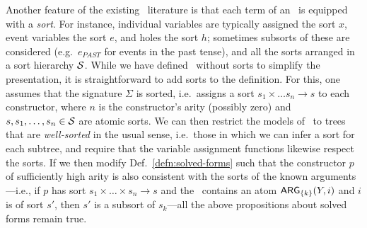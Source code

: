 Another feature of the existing \rmrs\ literature is that each term of
an \rmrs\ is equipped 
with a \emph{sort}.  For instance, individual variables are typically
assigned the sort $x$, event variables the sort $e$, and holes the
sort $h$; sometimes subsorts of these are considered (e.g.\ $e_{PAST}$
for events in the past tense), and all the sorts arranged in a sort
hierarchy ${\cal S}$.
While we have defined \rmrs\ without sorts to simplify the
presentation, it is straightforward to add sorts to the definition.
For this, one assumes that the signature $\Sigma$ is sorted, i.e.\
assigns a sort $s_1\times\ldots s_n\rightarrow s$ to each constructor,
where $n$ is the constructor's arity (possibly zero) and
$s,s_1,\ldots,s_n\in {\cal S}$ are atomic sorts.  We can then
restrict the models of \rmrs\ to trees that are \emph{well-sorted} in
the usual sense, i.e.\ those in which we can infer a sort for each
subtree, and require that the variable assignment functions likewise
respect the sorts.  If we then modify Def.~\ref{defn:solved-forms}
such that the constructor $p$ of sufficiently high arity is also
consistent with the sorts of the known arguments---i.e., if $p$ has
sort $s_1 \times \ldots \times s_n \rightarrow s$ and the \rmrs\
contains an atom $\mathsf{ARG}_{\{k\}}(Y,i)$ and $i$ is of sort $s'$, then
$s'$ is a subsort of $s_k$---all the above propositions about solved
forms remain true.




